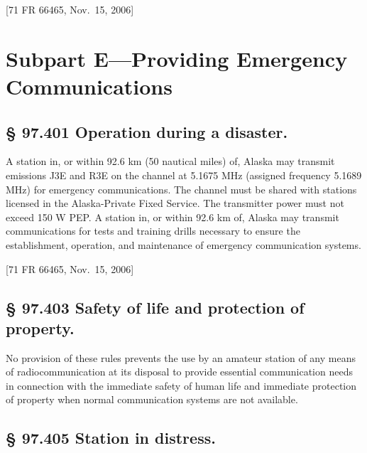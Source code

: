 \documentclass[
  letterpaper,
  DIV=11,
  numbers=noendperiod]{scrreport}
\begin{document}
{[}71 FR 66465, Nov.~15, 2006{]}

\hypertarget{subpart_E}{%
\section*{Subpart E---Providing Emergency
Communications}\label{subpart_E}}


\hypertarget{97.401}{%
\subsection*{§ 97.401 Operation during a disaster.}\label{97.401}}

A station in, or within 92.6 km (50 nautical miles) of, Alaska may
transmit emissions J3E and R3E on the channel at 5.1675 MHz (assigned
frequency 5.1689 MHz) for emergency communications. The channel must be
shared with stations licensed in the Alaska-Private Fixed Service. The
transmitter power must not exceed 150 W PEP. A station in, or within
92.6 km of, Alaska may transmit communications for tests and training
drills necessary to ensure the establishment, operation, and maintenance
of emergency communication systems.

{[}71 FR 66465, Nov.~15, 2006{]}

\hypertarget{97.403}{%
\subsection*{§ 97.403 Safety of life and protection of
property.}\label{97.403}}

No provision of these rules prevents the use by an amateur station of
any means of radiocommunication at its disposal to provide essential
communication needs in connection with the immediate safety of human
life and immediate protection of property when normal communication
systems are not available.

\hypertarget{97.405}{%
\subsection*{§ 97.405 Station in distress.}\label{97.405}}
\end{document}
